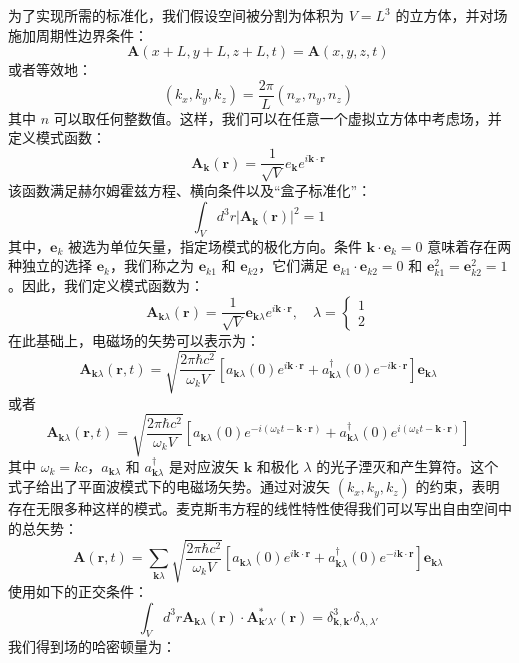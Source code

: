为了实现所需的标准化，我们假设空间被分割为体积为 \( V = L^3 \) 的立方体，并对场施加周期性边界条件：
\[
\mathbf{A}(x+L, y+L, z+L, t) = \mathbf{A}(x, y, z, t)~
\]
或者等效地：
\[
(k_x, k_y, k_z) = \frac{2\pi}{L}(n_x, n_y, n_z)~
\]
其中 \( n \) 可以取任何整数值。这样，我们可以在任意一个虚拟立方体中考虑场，并定义模式函数：
\[
\mathbf{A}_{\mathbf{k}}(\mathbf{r}) = \frac{1}{\sqrt{V}} e_{\mathbf{k}} e^{i \mathbf{k} \cdot \mathbf{r}}~
\]
该函数满足赫尔姆霍兹方程、横向条件以及“盒子标准化”：
\[
\int_V d^3r \left|\mathbf{A}_{\mathbf{k}}(\mathbf{r})\right|^2 = 1~
\]
其中，\(\mathbf{e}_k\) 被选为单位矢量，指定场模式的极化方向。条件 \( \mathbf{k} \cdot \mathbf{e}_k = 0 \) 意味着存在两种独立的选择 \(\mathbf{e}_k\)，我们称之为 \(\mathbf{e}_{k1}\) 和 \(\mathbf{e}_{k2}\)，它们满足 \(\mathbf{e}_{k1} \cdot \mathbf{e}_{k2} = 0\) 和 \( \mathbf{e}_{k1}^2 = \mathbf{e}_{k2}^2 = 1 \)。因此，我们定义模式函数为：
\[
\mathbf{A}_{\mathbf{k} \lambda}(\mathbf{r}) = \frac{1}{\sqrt{V}} \mathbf{e}_{\mathbf{k} \lambda} e^{i \mathbf{k} \cdot \mathbf{r}}, \quad \lambda = \begin{cases}1 \\ 2\end{cases}~
\]
在此基础上，电磁场的矢势可以表示为：
\[
\mathbf{A}_{\mathbf{k} \lambda}(\mathbf{r}, t) = \sqrt{\frac{2\pi \hbar c^2}{\omega_k V}} \left[ a_{\mathbf{k} \lambda}(0) e^{i \mathbf{k} \cdot \mathbf{r}} + a_{\mathbf{k} \lambda}^\dagger(0) e^{-i \mathbf{k} \cdot \mathbf{r}} \right] \mathbf{e}_{\mathbf{k} \lambda}~
\]
或者
\[
\mathbf{A}_{\mathbf{k} \lambda}(\mathbf{r}, t) = \sqrt{\frac{2\pi \hbar c^2}{\omega_k V}} \left[ a_{\mathbf{k} \lambda}(0) e^{-i(\omega_k t - \mathbf{k} \cdot \mathbf{r})} + a_{\mathbf{k} \lambda}^\dagger(0) e^{i(\omega_k t - \mathbf{k} \cdot \mathbf{r})} \right]~
\]
其中 \(\omega_k = k c\)，\(a_{\mathbf{k} \lambda}\) 和 \(a_{\mathbf{k} \lambda}^\dagger\) 是对应波矢 \(\mathbf{k}\) 和极化 \(\lambda\) 的光子湮灭和产生算符。这个式子给出了平面波模式下的电磁场矢势。通过对波矢 \((k_x, k_y, k_z)\) 的约束，表明存在无限多种这样的模式。麦克斯韦方程的线性特性使得我们可以写出自由空间中的总矢势：
\[
\mathbf{A}(\mathbf{r}, t) = \sum_{\mathbf{k} \lambda} \sqrt{\frac{2\pi \hbar c^2}{\omega_k V}} \left[ a_{\mathbf{k} \lambda}(0) e^{i \mathbf{k} \cdot \mathbf{r}} + a_{\mathbf{k} \lambda}^\dagger(0) e^{-i \mathbf{k} \cdot \mathbf{r}} \right] \mathbf{e}_{\mathbf{k} \lambda}~
\]
使用如下的正交条件：
\[
\int_V d^3r \mathbf{A}_{\mathbf{k} \lambda}(\mathbf{r}) \cdot \mathbf{A}_{\mathbf{k'} \lambda'}^*(\mathbf{r}) = \delta_{\mathbf{k}, \mathbf{k'}}^3 \delta_{\lambda, \lambda'}~
\]
我们得到场的哈密顿量为：
